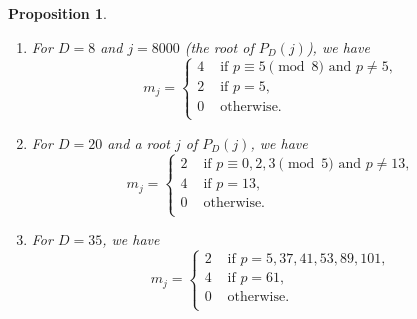 \documentclass[a4paper, 11pt]{article}
\theoremstyle{plain}
\newtheorem{prop}[defn]{Proposition}
\newcommand{\?}{\textcolor{red}{??}}
\begin{document}
\begin{prop}
\label{GZmultiplicity}
\begin{enumerate}
\item[(1)] For $D=8$ and $j=8000$ (the root of $P_D(j)$),
we have
\[
m_j = \begin{cases}
4 & \text{ if } p \equiv 5 \pmod 8 \text{ and } p \ne 5,\\
2 & \text{ if } p = 5,\\
0 & \text{ otherwise. }\\
\end{cases}
\]
\item[(2)] For $D=20$ and a root $j$ of $P_D(j)$, we have
\[
m_j = \begin{cases}
2 & \text{ if } p \equiv 0, 2,3 \pmod 5 \text{ and } p\ne 13,\\
4 & \text{ if } p=13,\\
0 & \text{ otherwise.} \\
\end{cases}
\]
\item[(3)] For $D=35$, we have
\[
m_j = \begin{cases}
2 & \text{ if } p = 5, 37, 41, 53, 89, 101,\\
4 & \text{ if } p = 61,\\
0 & \text{ otherwise. }\\
\end{cases}
\]
\end{enumerate}
\end{prop}
\end{document}
